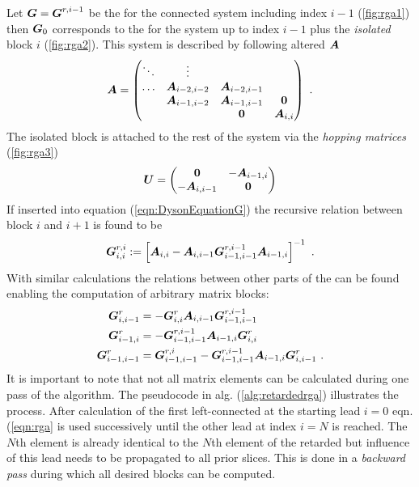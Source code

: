 Let $\boldsymbol{G}=\boldsymbol{G}^{r,i-1}$ be the \gfnc{} for the connected system including index $i-1$ (\cref{fig:rga1}) then $\boldsymbol{G}_0$ corresponds to the \gfnc{} for the system up to index $i-1$ plus the \emph{isolated} block $i$ (\cref{fig:rga2}).  This system is described by following altered \hamil{} $\boldsymbol{A}$
\begin{align}
\boldsymbol{A} = 
\begin{pmatrix}
\ddots 	& \vdots 	   & 		   & \\
\dots   & \boldsymbol{A}_{i-2,i-2}&\boldsymbol{A}_{i-2,i-1}& \\
     	& \boldsymbol{A}_{i-1,i-2}  &\boldsymbol{A}_{i-1,i-1}  & \boldsymbol{0} \\ 
	&  		   & \boldsymbol{0} 	   & \boldsymbol{A}_{i,i}
\end{pmatrix}\ .
\end{align}
The isolated block is attached to the rest of the system via the \emph{hopping matrices} (\cref{fig:rga3})
\begin{align}
\boldsymbol{U} = 
\begin{pmatrix}
\boldsymbol{0}& -\boldsymbol{A}_{i-1,i}\\
-\boldsymbol{A}_{i,i-1}&\boldsymbol{0}
\end{pmatrix}
\end{align}
If inserted into equation (\ref{eqn:DysonEquationG}) the recursive relation between block $i$ and $i+1$ is found to be
\begin{align}
\mat{G}^{r,i}_{i,i} := \left[\mat{A}_{i,i}-\mat{A}_{i,i-1}\mat{G}^{r,i-1}_{i-1,i-1}\mat{A}_{i-1,i}\right]^{-1}\ .
\label{eqn:rga}
\end{align}
With similar calculations the relations between other parts of the \gfnc{} can be found enabling the computation of arbitrary matrix blocks:
\begin{align}
\mat{G}^r_{i,i-1} &= -\mat{G}^r_{i,i}\mat{A}_{i,i-1}\mat{G}^{r,i-1}_{i-1,i-1}\\
\mat{G}^r_{i-1,i} &= -\mat{G}^{r,i-1}_{i-1,i-1}\mat{A}_{i-1,i} \mat{G}^{r}_{i,i}\\
\mat{G}^r_{i-1,i-1} &= \mat{G}^{r,i}_{i-1,i-1}-\mat{G}^{r,i-1}_{i-1,i-1}\mat{A}_{i-1,i}\mat{G}^{r}_{i,i-1}\ .
\end{align}
It is important to note that not all matrix elements can be calculated during one pass of the algorithm. The pseudocode in alg. (\ref{alg:retardedrga}) illustrates the process. After calculation of the first left-connected \gfnc{} at the starting lead $i=0$ eqn. (\ref{eqn:rga} is used successively until the other lead at index $i=N$ is reached. The $N$th element is already identical to the $N$th element of the retarded \gfnc{} but influence of this lead needs to be propagated to all prior slices. This is done in a \emph{backward pass} during which all desired blocks can be computed.\par
